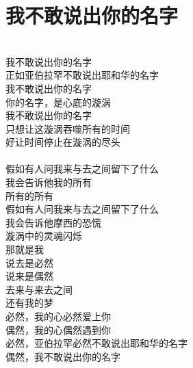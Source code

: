 \section{我不敢说出你的名字}
\leftskip=25mm
\noindent \\
我不敢说出你的名字\\
正如亚伯拉罕不敢说出耶和华的名字\\

我不敢说出你的名字\\
你的名字，是心底的漩涡\\
我不敢说出你的名字\\
只想让这漩涡吞噬所有的时间\\
好让时间停止在漩涡的尽头\\
\\
假如有人问我来与去之间留下了什么\\
我会告诉他我的所有\\
所有的所有\\
假如有人问我来与去之间留下了什么\\
我会告诉他摩西的恐慌\\
漩涡中的灵魂闪烁\\
那就是我\\

说去是必然\\
说来是偶然\\
去来与来去之间\\
还有我的梦\\
必然，我的心必然爱上你\\
偶然，我的心偶然遇到你\\
必然，亚伯拉罕必然不敢说出耶和华的名字\\
偶然，我不敢说出你的名字
